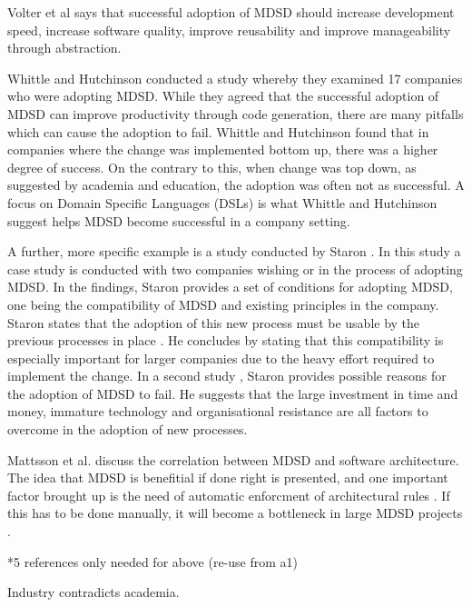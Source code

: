 \documentclass[10pt,twocolumn]{article}
\begin{document}
Volter et al\cite{volter2013model} says that successful adoption of MDSD should increase development speed, increase software quality, improve reusability and improve manageability through abstraction.

Whittle and Hutchinson \cite{whittle2012mismatches} conducted a study whereby they examined 17 companies who were adopting MDSD. While they agreed that the successful adoption of MDSD can improve productivity through code generation, there are many pitfalls which can cause the adoption to fail. Whittle and Hutchinson found that in companies where the change was implemented bottom up, there was a higher degree of success. On the contrary to this, when change was top down, as suggested by academia and education, the adoption was often not as successful. A focus on Domain Specific Languages (DSLs) is what Whittle and Hutchinson suggest helps MDSD become successful in a company setting.

A further, more specific example is a study conducted by Staron \cite{staron2006adopting}. In this study a case study is conducted with two companies wishing or in the process of adopting MDSD. In the findings, Staron provides a set of conditions for adopting MDSD, one being the compatibility of MDSD and existing principles in the company. Staron states that the adoption of this new process must be usable by the previous processes in place \cite{staron2006adopting}. He concludes by stating that this compatibility is especially important for larger companies due to the heavy effort required to implement the change. In a second study \cite{staron2008transitioning}, Staron provides possible reasons for the adoption of MDSD to fail. He suggests that the large investment in time and money, immature technology and organisational resistance are all factors to overcome in the adoption of new processes.

Mattsson et al. \cite{mattsson2009linking} discuss the correlation between MDSD and software architecture. The idea that MDSD is benefitial if done right is presented, and one important factor brought up is the need of automatic enforcment of architectural rules \cite{mattsson2009linking}. If this has to be done manually, it will become a bottleneck in large MDSD projects \cite{mattsson2009linking}.


*5 references only needed for above (re-use from a1)

Industry contradicts academia. 
\end{document}
